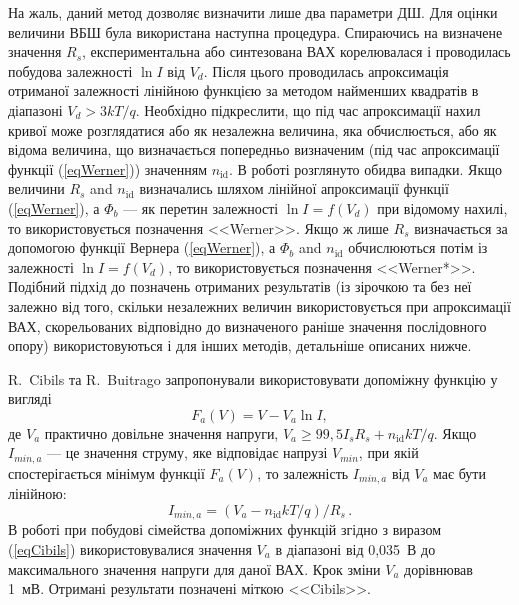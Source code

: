 На жаль, даний метод дозволяє визначити лише два параметри ДШ.
Для оцінки величини ВБШ була використана наступна процедура.
Спираючись на визначене значення $R_s$, експериментальна або синтезована ВАХ корелювалася і проводилась побудова залежності  $\ln I$ від $V_d$.
Після цього проводилась апроксимація отриманої залежності лінійною функцією за методом найменших квадратів \cite[с.~67]{KalitkinBook} в діапазоні $V_d>3kT/q$.
Необхідно підкреслити, що під час апроксимації нахил кривої може розглядатися або як незалежна величина, яка обчислюється, або як відома величина, що визначається попередньо визначеним (під час апроксимації функції (\ref{eqWerner})) значенням $n_\mathrm{id}$.
В роботі розглянуто обидва випадки.
Якщо величини $R_s$ and $n_\mathrm{id}$ визначались шляхом лінійної апроксимації функції (\ref{eqWerner}), а $\Phi_b$ --- як перетин залежності $\ln I=f(V_d)$ при відомому нахилі, то використовується позначення <<Werner>>.
Якщо ж лише $R_s$ визначається за допомогою функції Вернера (\ref{eqWerner}), а $\Phi_b$ and $n_\mathrm{id}$ обчислюються потім із залежності $\ln I=f(V_d)$, то використовується позначення <<Werner*>>.
Подібний підхід до позначень отриманих результатів (із зірочкою та без неї залежно від того, скільки незалежних величин використовується при апроксимації ВАХ, скорельованих відповідно до визначеного раніше значення послідовного опору) використовуються і для інших методів, детальніше описаних нижче.

R.~Cibils  та R.~Buitrago \cite{Cibils} запропонували використовувати допоміжну функцію у вигляді
\begin{equation}
\label{eqCibils}
F_a(V)=V-V_a\ln I,
\end{equation}
де
$V_a$ практично довільне значення напруги, $V_a\geq99,5I_sR_s+n_\mathrm{id}kT/q$.
Якщо $I_{min,a}$ --- це значення струму, яке відповідає напрузі $V_{min}$, при якій спостерігається мінімум функції $F_a(V)$,
то залежність $I_{min,a}$ від $V_a$ має бути \cite{Cibils} лінійною:
\begin{equation}
\label{eqCibilsDet}
I_{min,a}=(V_a-n_\mathrm{id}kT/q)/R_s\,.
\end{equation}
В роботі при побудові сімейства допоміжних функцій згідно з виразом (\ref{eqCibils}) використовувалися значення  $V_a$ в діапазоні від 0,035~В до максимального значення напруги для даної ВАХ.
Крок зміни $V_a$ дорівнював 1~мВ.
Отримані результати позначені міткою <<Cibils>>.

